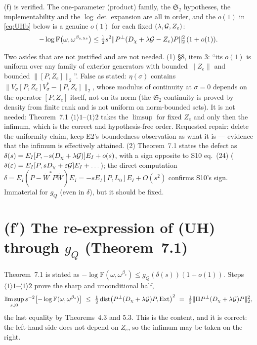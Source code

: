 \documentclass[11pt]{article}
\newcommand{\Wt}{\widetilde W}\newcommand{\Om}{\Omega}\newcommand{\Gm}{\Gamma}
\newcommand{\Stwo}{\mathfrak S_2}\newcommand{\Sone}{\mathfrak S_1}
\newcommand{\norm}[1]{\lVert #1\rVert}\newcommand{\abs}[1]{\lvert #1\rvert}
\newcommand{\Ext}{\mathrm{Ext}}\newcommand{\Nvis}{\mathcal N}
\DeclareMathOperator{\dist}{dist}\DeclareMathOperator{\ran}{ran}
\begin{document}
\begin{verdictok}
(f) is verified.  The one-parameter (product) family, the $\Stwo$ hypotheses, the
implementability and the $\log\det$ expansion are all in order, and the $o(1)$ in
\eqref{eq:UHb} below is a genuine $o(1)$ for each fixed $(\lambda,\mathcal G,Z_e)$:
\begin{equation}\label{eq:UHb}
 -\log\mathrm F\bigl(\omega,\omega^{\beta_{s,\lambda s}}\bigr)\le
 \tfrac12s^2\norm{\Pperp(D_\chi+\lambda\Gs-Z_e)P}_2^2\,(1+o(1)).
\end{equation}
\end{verdictok}

\begin{verdictgap}
Two asides that are not justified and are not needed.  (1) \S8, item 3: ``its $o(1)$ is
uniform over any family of exterior generators with bounded $\norm{Z_e}$ and bounded
$\norm{[P,Z_e]}_2$''.  False as stated: $\eta(\sigma)$ contains
$\norm{V_\sigma[P,Z_e]V_\sigma^*-[P,Z_e]}_2$, whose modulus of continuity at $\sigma=0$
depends on the operator $[P,Z_e]$ itself, not on its norm (the $\Stwo$-continuity is proved
by density from finite rank and is not uniform on norm-bounded sets).  It is not needed:
Theorem~7.1 $\langle1\rangle1$--$\langle1\rangle2$ takes the $\limsup$ for fixed $Z_e$ and
only then the infimum, which is the correct and hypothesis-free order.  Requested repair:
delete the uniformity claim, keep E2's boundedness observation as what it is --- evidence
that the infimum is effectively attained.  (2) Theorem~7.1 states the defect as
$\delta(s)=E_I[P,-s(D_\chi+\lambda\mathcal G)]E_I+o(s)$, with a sign opposite to S10 eq.~(24)
($\delta(\varepsilon)=E_I[P,sD_\chi+\varepsilon\mathcal G]E_I+\dots$); the direct computation
$\delta=E_I(P-\Wt^*P\Wt)E_I=-sE_I[P,L_0]E_I+O(s^2)$ confirms S10's sign.  Immaterial for
$g_Q$ (even in $\delta$), but it should be fixed.
\end{verdictgap}

\section{(f$'$) The re-expression of (UH) through $g_Q$ (Theorem~7.1)}\label{sec:fp}

Theorem~7.1 is stated as $-\log\mathrm F(\omega,\omega^{\beta_s})\le g_Q(\delta(s))(1+o(1))$.
Steps $\langle1\rangle1$--$\langle1\rangle2$ prove the sharp and unconditional half,
\begin{equation}\label{eq:sharphalf}
 \limsup_{s\downarrow0}s^{-2}\bigl[-\log\mathrm F(\omega,\omega^{\beta_s})\bigr]
 \ \le\ \tfrac12\dist\bigl(\Pperp(D_\chi+\lambda\Gs)P,\Ext\bigr)^2
 \ =\ \tfrac12\norm{\Pi\Pperp(D_\chi+\lambda\Gs)P}_2^2 ,
\end{equation}
the last equality by Theorems~4.3 and 5.3.  This is the content, and it is correct: the
left-hand side does not depend on $Z_e$, so the infimum may be taken on the right.
\end{document}
